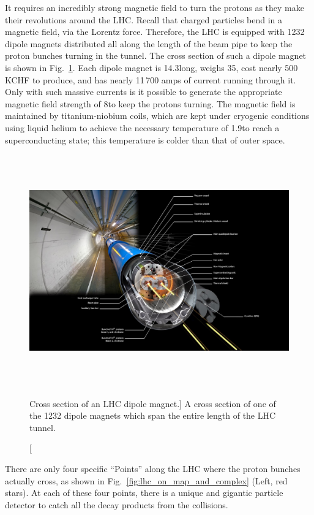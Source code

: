 It requires an incredibly strong magnetic field to turn the protons as they make their revolutions around the LHC. 
Recall that charged particles bend in a magnetic field, via the Lorentz force. 
Therefore, the LHC is equipped with 1232 dipole magnets distributed all along the length of the beam pipe to keep the proton bunches turning in the tunnel.
The cross section of such a dipole magnet is shown in Fig.~\ref{fig:lhc_dipole_xs}.
Each dipole magnet is 14.3\meter long, weighs 35\tonne, cost nearly 500\,KCHF to produce, and has nearly 11\,700
amps of current running through it. 
Only with such massive currents is it possible to generate the appropriate magnetic field strength of 8\tesla to keep the protons turning. 
The magnetic field is maintained by titanium-niobium coils, which are kept under cryogenic conditions using liquid helium to achieve the necessary temperature of 1.9\kelvin to reach a superconducting state; 
this temperature is colder than that of outer space.
\begin{figure}[pbth]
\centering
\includegraphics[width=15cm,height=10cm,keepaspectratio]{figures/lhc/lhc_dipole_xs.jpg}
    \caption
        [Cross section of an LHC dipole magnet.]
        {A cross section of one of the 1232 dipole magnets which span the entire length of the LHC tunnel.} 
    \label{fig:lhc_dipole_xs}
\end{figure}

There are only four specific ``Points'' along the LHC where the proton bunches actually cross, as shown in Fig.~\ref{fig:lhc_on_map_and_complex} (Left, red stars).
At each of these four points, there is a unique and gigantic particle detector to catch all the decay products from the \pp collisions. 

